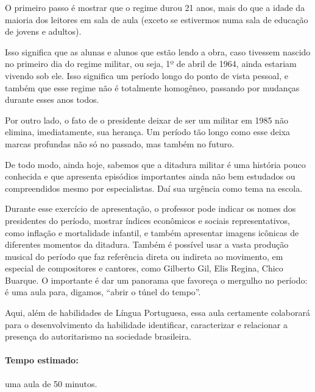 \documentclass[12pt]{extarticle}
\begin{document}
O primeiro passo é mostrar que o regime durou 21 anos, mais do que a
idade da maioria dos leitores em sala de aula (exceto se estivermos numa
sala de educação de jovens e adultos).

Isso significa que as alunas e alunos que estão lendo a obra, caso
tivessem nascido no primeiro dia do regime militar, ou seja, 1º de abril
de 1964, ainda estariam vivendo sob ele. Isso significa um período longo
do ponto de vista pessoal, e também que esse regime não é totalmente
homogêneo, passando por mudanças durante esses anos todos.



Por outro lado, o fato de o presidente deixar de ser um militar em 1985
não elimina, imediatamente, sua herança. Um período tão longo como esse
deixa marcas profundas não só no passado, mas também no futuro.

De todo modo, ainda hoje, sabemos que a ditadura militar é uma história
pouco conhecida e que apresenta episódios importantes ainda não bem
estudados ou compreendidos mesmo por especialistas. Daí sua urgência
como tema na escola.

Durante esse exercício de apresentação, o professor pode indicar os
nomes dos presidentes do período, mostrar índices econômicos e sociais
representativos, como inflação e mortalidade infantil, e também
apresentar imagens icônicas de diferentes momentos da ditadura. Também é
possível usar a vasta produção musical do período que faz referência
direta ou indireta ao movimento, em especial de compositores e cantores,
como Gilberto Gil, Elis Regina, Chico Buarque. O importante é dar um
panorama que favoreça o mergulho no período: é uma aula para, digamos,
``abrir o túnel do tempo''.

Aqui, além de habilidades de Língua Portuguesa, essa aula certamente colaborará para o desenvolvimento da habilidade identificar, caracterizar e relacionar a presença do autoritarismo na sociedade brasileira.




\paragraph{Tempo estimado:} uma aula de 50 minutos.
\end{document}
